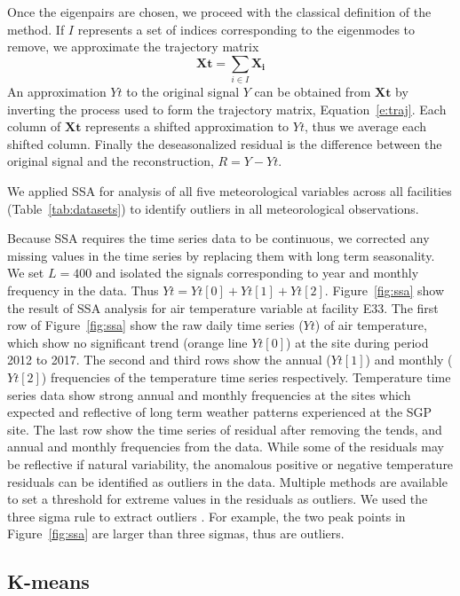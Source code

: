 Once the eigenpairs are chosen, we proceed with the classical definition
of the method. If $I$ represents a set of indices corresponding to the
eigenmodes to remove, we approximate the trajectory matrix
%
\begin{equation*}
    \mathbf{Xt} = \sum_{i\in I} \mathbf{X_i}
\end{equation*}
%
An approximation $Yt$ to the original signal $Y$ can be obtained from
$\mathbf{Xt}$ by inverting the process used to form the trajectory
matrix, Equation~\eqref{e:traj}. Each column of $\mathbf{Xt}$ represents
a shifted approximation to $Yt$, thus we average each shifted column.
Finally the deseasonalized residual is the difference between the
original signal and the reconstruction, $R=Y-Yt$.

We applied SSA for analysis of all five meteorological variables across
all facilities (Table~\ref{tab:datasets}) to identify outliers in all
meteorological observations.

Because SSA requires the time series data to be continuous, 
we corrected any missing values in the time series by replacing them
with long term seasonality. 
We set $L = 400$ and isolated the signals corresponding to year and
monthly frequency in the data.
Thus $Yt = Yt[0] + Yt[1] + Yt[2]$.
Figure~\ref{fig:ssa} show the result of SSA analysis for
air temperature variable at facility E33. The first row of
Figure~\ref{fig:ssa} show the raw daily time series ($Yt$) of
air temperature, which show no significant trend (orange line
$Yt[0]$) at the site during period 2012 to 2017.
The second and third rows show the annual ($Yt[1]$) and monthly
($Yt[2]$) frequencies of the temperature time series respectively. 
Temperature time series data show strong annual and monthly frequencies
at the sites which expected and reflective of long term weather patterns
experienced at the SGP site. 
The last row show the time series of residual after removing the tends,
and annual and monthly frequencies from the data. While some of the
residuals may be reflective if natural variability, the
anomalous positive or negative temperature residuals can be identified
as outliers in the data. Multiple methods are available to set a threshold 
for extreme values in the residuals as outliers. We used the three sigma 
rule to extract outliers \cite{pukelsheim1994three}. For example, the two
peak points in Figure~\ref{fig:ssa} are larger than three sigmas, 
thus are outliers.

\subsection{K-means}

